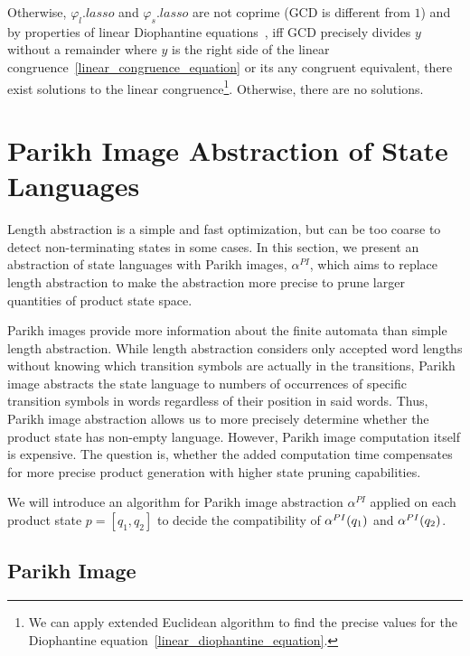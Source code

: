 Otherwise, $\varphi_l.lasso$ and $\varphi_s.lasso$ are not coprime (GCD is different from $1$) and by properties of linear Diophantine equations~\cite{LinearCongruences}, iff GCD precisely divides $y$ without a remainder where $y$ is the right side of the linear congruence~\ref{linear_congruence_equation} or its any congruent equivalent, there exist solutions to the linear congruence\footnote{We can apply extended Euclidean algorithm to find the precise values for the Diophantine equation~\ref{linear_diophantine_equation}.}. Otherwise, there are no solutions.

\section{Parikh Image Abstraction of State Languages}

Length abstraction is a simple and fast optimization, but can be too coarse to detect non-terminating states in some cases. In this section, we present an abstraction of state languages with Parikh images, $\alpha^{PI}$, which aims to replace length abstraction to make the abstraction more precise to prune larger quantities of product state space.

Parikh images provide more information about the finite automata than simple length abstraction. While length abstraction considers only accepted word lengths without knowing which transition symbols are actually in the transitions, Parikh image abstracts the state language to numbers of occurrences of specific transition symbols in words regardless of their position in said words. Thus, Parikh image abstraction allows us to more precisely determine whether the product state has non-empty language. However, Parikh image computation itself is expensive. The question is, whether the added computation time compensates for more precise product generation with higher state pruning capabilities.

We will introduce an algorithm for Parikh image abstraction $\alpha^{PI}$ applied on each product state $p = [q_1, q_2]$ to decide the compatibility of $\alpha^{PI}(q_1)$ and $\alpha^{PI}(q_2)$.

\subsection{Parikh Image} \label{sec:parikhImage}

